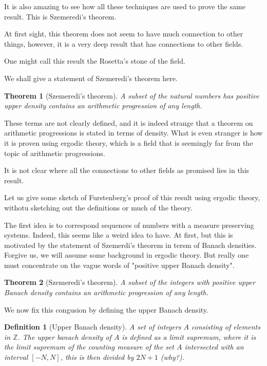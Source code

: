 \documentclass[12pt]{article}
\newtheorem{definition}{Definition}
\newtheorem{theorem}{Theorem}
\begin{document}
It is also amazing to see how all these techniques are used to prove the same result. This is Szemeredi's theorem.

At first sight, this theorem does not seem to have much connection to other things, however, it is a very deep result that has connections to other fields.

One might call this result the Rosetta's stone of the field.

We shall give a statement of Szemeredi's theorem here.

\begin{theorem}[Szemeredi's theorem]
    A subset of the natural numbers has positive upper density contains an arithmetic progression of any length.
\end{theorem}

These terms are not clearly defined, and it is indeed strange that a theorem on arithmetic progressions is stated in terms of density. What is even stranger is how it is proven using ergodic theory, which is a field that is seemingly far from the topic of arithmetic progressions.

It is not clear where all the connections to other fields as promised lies in this result.

Let us give some sketch of Furstenberg's proof of this result using ergodic theory, withotu sketching out the definitions or much of the theory.

The first idea is to correspond sequences of numbers with a measure preserving systems. Indeed, this seems like a weird idea to have. At first, but this is motivated by the statement of Szemerdi's theorem in tersm of Banach densities. Forgive us, we will assume some background in ergodic theory. But really one must concentrate on the vague words of "positive upper Banach density".

\begin{theorem}[Szemeredi's theorem]
    A subset of the integers with positive upper Banach density contains an arithmetic progression of any length.
\end{theorem}

We now fix this congusion by defining the upper Banach density.

\begin{definition}[Upper Banach density]
    A set of integers $A$ consisting of elements in $\mathbb{Z}$. The upper banach density of $A$ is defined as a limit supremum, where it is the limit supremum of the counting measure of the set $A$ intersected with an interval $[-N, N]$, this is then divided by $2N + 1$ (why?).
\end{definition}
\end{document}
